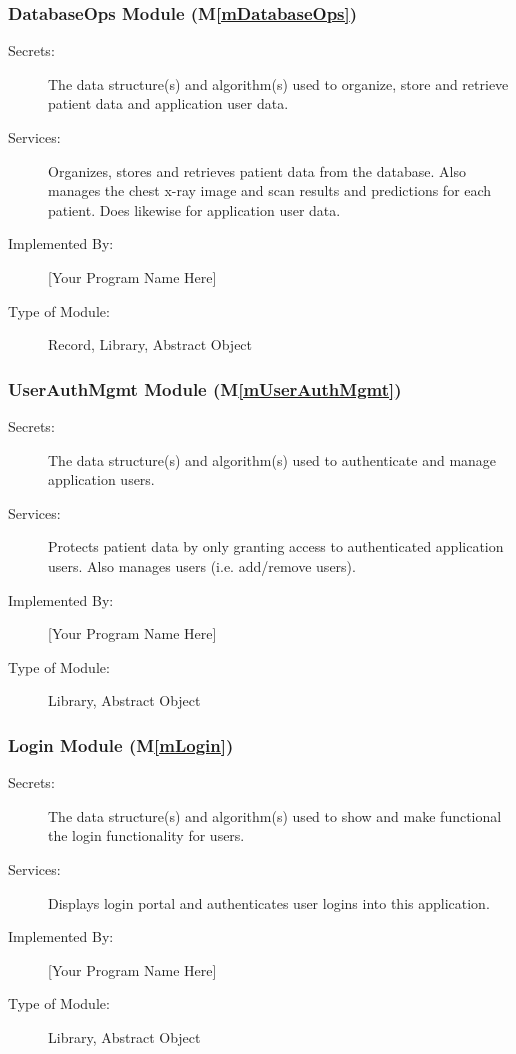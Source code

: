 \documentclass[12pt, titlepage]{article}
\newcommand{\mref}[1]{M\ref{#1}}
\begin{document}
\subsubsection{DatabaseOps Module (\mref{mDatabaseOps})}

\begin{description}
\item[Secrets:] The data structure(s) and algorithm(s) used to organize, store
  and retrieve patient data and application user data.
\item[Services:] Organizes, stores and retrieves patient data from the 
  database. Also manages the chest x-ray image and scan results and 
  predictions for each patient. Does likewise for application user data.
\item[Implemented By:] [Your Program Name Here]
\item[Type of Module:] Record, Library, Abstract Object
\end{description}

\subsubsection{UserAuthMgmt Module (\mref{mUserAuthMgmt})}

\begin{description}
\item[Secrets:] The data structure(s) and algorithm(s) used to authenticate
  and manage application users.
\item[Services:] Protects patient data by only granting access to
  authenticated application users. Also manages users (i.e. add/remove users).
\item[Implemented By:] [Your Program Name Here]
\item[Type of Module:] Library, Abstract Object
\end{description}

\subsubsection{Login Module (\mref{mLogin})}

\begin{description}
\item[Secrets:] The data structure(s) and algorithm(s) used to show and make
  functional the login functionality for users.
\item[Services:] Displays login portal and authenticates user logins into this
  application.
\item[Implemented By:] [Your Program Name Here]
\item[Type of Module:] Library, Abstract Object
\end{description}
\end{document}
